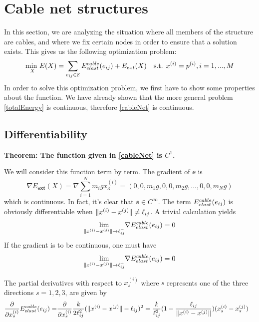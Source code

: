 \section{Cable net structures}
In this section, we are analyzing the situation where all members of the structure are cables, and where we fix certain nodes in order to ensure that a solution exists. This gives us the following optimization problem:
\begin{equation}
    \underset{X}{\text{min }} E(X) = \sum\limits_{e_{ij} \in \mathcal{E}} E^{cable}_{elast}(e_{ij}) + E_{ext}(X) \quad \text{s.t. } x^{(i)} = p^{(i)}, i = 1,...,M
    \label{cableNet}
\end{equation}
In order to solve this optimization problem, we first have to show some properties about the function. We have already shown that the more general problem \eqref{totalEnergy} is continuous, therefore \eqref{cableNet} is continuous.

\subsection{Differentiability}
\textbf{Theorem: The function given in \eqref{cableNet} is $C^1$.}

We will consider this function term by term.
The gradient of $\ee$ is 
\begin{equation}
    \nabla E_{\textbf{ext}}(X) = \nabla \sum_{i=1}^N m_i g x_3^{(i)}
    = (0,0,m_1 g, 0,0,m_2 g,...,0,0,m_N g)
    \label{gradient_external_force}
\end{equation}
which is continuous. In fact, it's clear that $\ee \in C^{\infty}$. The term $E^{cable}_{elast}(e_{ij})$ is obviously differentiable when $\lVert x^{(i)} - x^{(j)}\rVert \neq \ell_{ij}$. A trivial calculation yields
\begin{equation}
    \underset{\lVert x^{(i)} - x^{(j)}\rVert \to \ell_{ij} ^-}{\text{lim}} \nabla E^{cable}_{elast}(e_{ij}) = 0    
\end{equation}
If the gradient is to be continuous, one must have
\begin{equation}
    \underset{\lVert x^{(i)} - x^{(j)}\rVert \to \ell_{ij} ^+}{\text{lim}} \nabla E^{cable}_{elast}(e_{ij}) = 0    
\end{equation}

The partial derivatives with respect to $x_s^{(i)}$ where $s$ represents one of the three directions $s=1,2,3$, are given by
\begin{align}
    \frac{\partial}{\partial x_s^{(i)}} E^{cable}_{elast}(e_{ij}) = &\frac{\partial}{\partial x_s^{(i)}}  \frac{k}{2 \ell_{ij}^2} (\lVert x^{(i)} - x^{(j)}\rVert - \ell_{ij})^2 = \frac{k}{\ell_{ij}^2} (1- \frac{\ell_{ij}}{\lVert x^{(i)} - x^{(j)}\rVert}) (x_s^{(i)} - x_s^{(j)})
\end{align}

